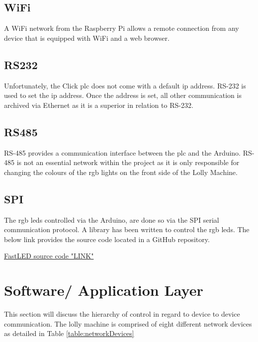     \subsection{WiFi}
    A WiFi network from the Raspberry Pi allows a remote connection from any device that is equipped with WiFi and a web browser. 
    
    \subsection{RS232}
    Unfortunately, the Click \acrshort{plc} does not come with a default \acrshort{ip} address. RS-232 is used to set the \acrshort{ip} address. Once the address is set, all other communication is archived via Ethernet as it is a superior in relation to RS-232.
    
    \subsection{RS485}
    RS-485 provides a communication interface between the \acrshort{plc} and the Arduino. RS-485 is not an essential network within the project as it is only responsible for changing the colours of the \acrshort{rgb} lights on the front side of the Lolly Machine.
    
    \subsection{SPI}
    The \acrshort{rgb} \acrshort{led}s controlled via the Arduino, are done so via the SPI serial communication protocol. A library has been written to control the \acrshort{rgb} \acrshort{led}s. The below link provides the source code located in a GitHub repository.
    
        \href{https://github.com/FastLED/FastLED}{FastLED source code "LINK"} \cite{FastLED} 
        
    \section{Software/ Application Layer}

    This section will discuss the hierarchy of control in regard to device to device communication. 
    The lolly machine is comprised of eight different network devices as detailed in Table \ref{table:networkDevices}

